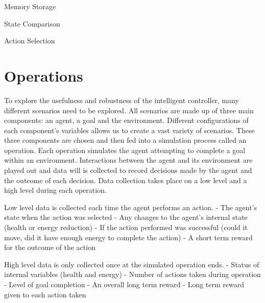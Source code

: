 Memory Storage

State Comparison

Action Selection



\section{Operations}
To explore the usefulness and robustness of the intelligent controller, many different scenarios need to be explored.
All scenarios are made up of three main components: an agent, a goal and the environment.
Different configurations of each component's variables allows us to create a vast variety of scenarios.
These three components are chosen and then fed into a simulation process called an operation. 
Each operation simulates the agent attempting to complete a goal within an environment.
Interactions between the agent and its environment are played out and data will is collected to record decisions made by the agent and the outcome of each decision.
Data collection takes place on a low level and a high level during each operation.

Low level data is collected each time the agent performs an action.
- The agent's state when the action was selected
- Any changes to the agent's internal state (health or energy reduction)
- If the action performed was successful (could it move, did it have enough energy to complete the action)
- A short term reward for the outcome of the action


High level data is only collected once at the simulated operation ends.
- Status of internal variables (health and energy)
- Number of actions taken during operation
- Level of goal completion
- An overall long term reward
- Long term reward given to each action taken


